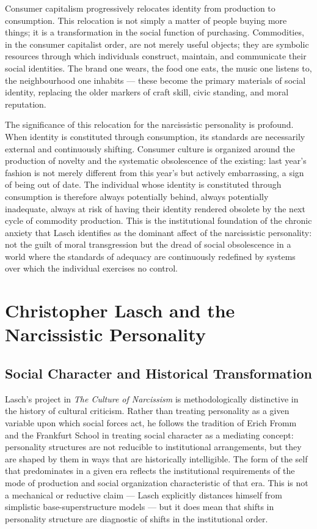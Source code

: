 \documentclass[12pt]{memoir}
\begin{document}
Consumer capitalism progressively relocates identity from production to consumption.
This relocation is not simply a matter of people buying more things; it is a
transformation in the social function of purchasing. Commodities, in the consumer
capitalist order, are not merely useful objects; they are symbolic resources through
which individuals construct, maintain, and communicate their social identities.
The brand one wears, the food one eats, the music one listens to, the neighbourhood
one inhabits — these become the primary materials of social identity, replacing the
older markers of craft skill, civic standing, and moral reputation.

The significance of this relocation for the narcissistic personality is profound.
When identity is constituted through consumption, its standards are necessarily
external and continuously shifting. Consumer culture is organized around the
production of novelty and the systematic obsolescence of the existing: last year's
fashion is not merely different from this year's but actively embarrassing, a sign
of being out of date. The individual whose identity is constituted through
consumption is therefore always potentially behind, always potentially inadequate,
always at risk of having their identity rendered obsolete by the next cycle of
commodity production. This is the institutional foundation of the chronic anxiety
that Lasch identifies as the dominant affect of the narcissistic personality: not
the guilt of moral transgression but the dread of social obsolescence in a world
where the standards of adequacy are continuously redefined by systems over which
the individual exercises no control.

\section{Christopher Lasch and the Narcissistic Personality}
\label{sec:lasch}

\subsection{Social Character and Historical Transformation}

Lasch's project in \textit{The Culture of Narcissism} is methodologically distinctive in the
history of cultural criticism. Rather than treating personality as a given variable upon which
social forces act, he follows the tradition of Erich Fromm and the Frankfurt School in treating
social character as a mediating concept: personality structures are not reducible to
institutional arrangements, but they are shaped by them in ways that are historically
intelligible. The form of the self that predominates in a given era reflects the institutional
requirements of the mode of production and social organization characteristic of that era. This
is not a mechanical or reductive claim — Lasch explicitly distances himself from simplistic
base-superstructure models — but it does mean that shifts in personality structure are
diagnostic of shifts in the institutional order.\citep[xv--xvi]{lasch1979}
\end{document}
